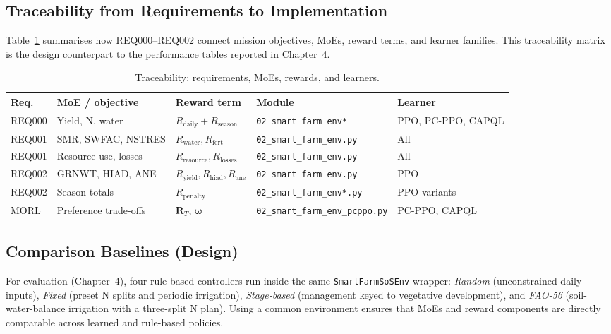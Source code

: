\subsection{Traceability from Requirements to Implementation}

Table~\ref{tab:trace} summarises how REQ000--REQ002 connect mission objectives,
MoEs, reward terms, and learner families. This traceability matrix is the
design counterpart to the performance tables reported in Chapter~4.

\begin{table}[ht]
\centering
\caption{Traceability: requirements, MoEs, rewards, and learners.}
\label{tab:trace}
\small
\renewcommand{\arraystretch}{1.2}
\begin{tabular}{>{\raggedright\arraybackslash}p{1.6cm}
                >{\raggedright\arraybackslash}p{2.8cm}
                >{\raggedright\arraybackslash}p{2.6cm}
                >{\raggedright\arraybackslash}p{2.4cm}
                >{\raggedright\arraybackslash}p{2.2cm}}
\toprule
\textbf{Req.} & \textbf{MoE / objective} & \textbf{Reward term} & \textbf{Module} & \textbf{Learner} \\
\midrule
REQ000 & Yield, N, water & $R_{\text{daily}}+R_{\text{season}}$ &
\texttt{02\_smart\_farm\_env*} & PPO, PC-PPO, CAPQL \\
REQ001 & SMR, SWFAC, NSTRES & $R_{\text{water}}, R_{\text{fert}}$ &
\texttt{02\_smart\_farm\_env.py} & All \\
REQ001 & Resource use, losses & $R_{\text{resource}}, R_{\text{losses}}$ &
\texttt{02\_smart\_farm\_env.py} & All \\
REQ002 & GRNWT, HIAD, ANE & $R_{\text{yield}}, R_{\text{hiad}}, R_{\text{ane}}$ &
\texttt{02\_smart\_farm\_env.py} & PPO \\
REQ002 & Season totals & $R_{\text{penalty}}$ &
\texttt{02\_smart\_farm\_env*.py} & PPO variants \\
MORL   & Preference trade-offs & $\mathbf{R}_T$, $\boldsymbol{\omega}$ &
\texttt{02\_smart\_farm\_env\_pcppo.py} & PC-PPO, CAPQL \\
\bottomrule
\end{tabular}
\end{table}


\subsection{Comparison Baselines (Design)}

For evaluation (Chapter~4), four rule-based controllers run inside the same
\texttt{SmartFarmSoSEnv} wrapper: \emph{Random} (unconstrained daily inputs),
\emph{Fixed} (preset N splits and periodic irrigation), \emph{Stage-based}
(management keyed to vegetative development), and \emph{FAO-56} (soil-water-balance
irrigation with a three-split N plan). Using a common environment ensures that
MoEs and reward components are directly comparable across learned and rule-based
policies.


